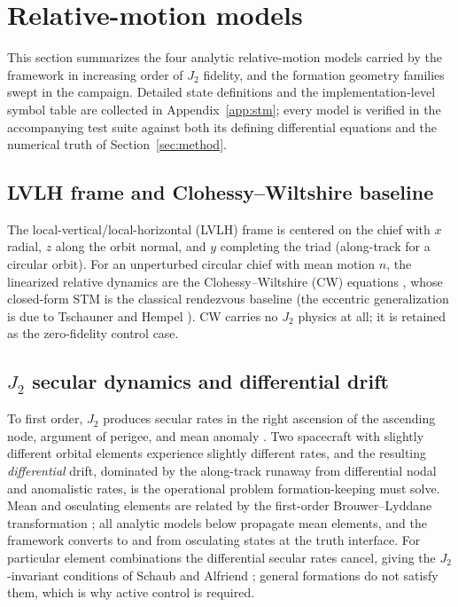 \section{Relative-motion models}\label{sec:models}

This section summarizes the four analytic relative-motion models carried by
the framework in increasing order of $J_2$ fidelity, and the formation
geometry families swept in the campaign. Detailed state definitions and the
implementation-level symbol table are collected in Appendix~\ref{app:stm};
every model is verified in the accompanying test suite against both its
defining differential equations and the numerical truth of
Section~\ref{sec:method}.

\subsection{LVLH frame and Clohessy--Wiltshire baseline}

The local-vertical/local-horizontal (LVLH) frame is centered on the chief
with $x$ radial, $z$ along the orbit normal, and $y$ completing the triad
(along-track for a circular orbit). For an unperturbed circular chief with
mean motion $n$, the linearized relative dynamics are the
Clohessy--Wiltshire (CW) equations \cite{clohessy1960terminal}, whose
closed-form STM is the classical rendezvous baseline (the eccentric
generalization is due to Tschauner and Hempel
\cite{tschauner1965rendezvous}). CW carries no $J_2$ physics at all; it is
retained as the zero-fidelity control case.

\subsection{$J_2$ secular dynamics and differential drift}

To first order, $J_2$ produces secular rates in the right ascension of the
ascending node, argument of perigee, and mean anomaly
\cite{brouwer1959solution,vallado2013fundamentals}. Two spacecraft with
slightly different orbital elements experience slightly different rates, and
the resulting \emph{differential} drift, dominated by the along-track
runaway from differential nodal and anomalistic rates, is the operational
problem formation-keeping must solve. Mean and osculating elements are
related by the first-order Brouwer--Lyddane transformation
\cite{brouwer1959solution,lyddane1963small}; all analytic models below
propagate mean elements, and the framework converts to and from osculating
states at the truth interface. For particular element combinations the
differential secular rates cancel, giving the $J_2$-invariant conditions of
Schaub and Alfriend \cite{schaub2001j2invariant}; general formations do not
satisfy them, which is why active control is required.

